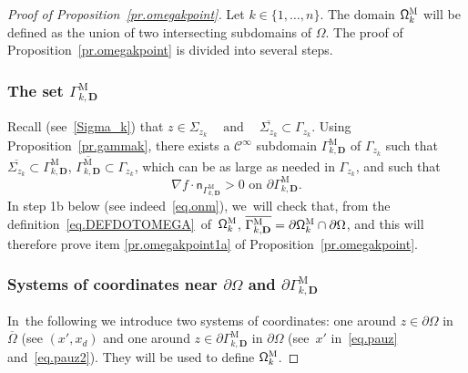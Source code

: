 \documentclass[10pt]{amsart}
\newcommand{\quand}{\quad\text{and}\quad}
\newcommand{\mbf}[1]{\mathbf{#1}}
\let\pa\partial
\theoremstyle{plain}
\theoremstyle{definition}
\begin{document}
\begin{proof}[Proof of Proposition~\ref{pr.omegakpoint}] Let $k\in \{1,\ldots,n\}$. The domain $\mathsf \Omega_k^{\textsc{M}}$ will be defined as the union of two intersecting subdomains of $\Omega$. The proof of Proposition~\ref{pr.omegakpoint} is divided into several steps.



\subsubsection*{The set $\Gamma_{k,\mbf D}^{\text{M}}$} Recall
(see~\eqref{Sigma_k}) that
$
z\in \Sigma_{z_k} \ \quand \ \overline{\Sigma_{z_k} }\subset \Gamma_{z_k}$.
Using Proposition~\ref{pr.gammak}, there exists a $\mathcal
C^\infty$ subdomain $\Gamma_{k,\mbf D}^{\text{M}}$ of $\Gamma_{z_k}$
such that $\overline{\Sigma_{z_k}}\subset \Gamma_{k,\mbf
D}^{\text{M}}$, $\overline{\Gamma_{k,\mbf D}^{\text{M}}}\subset
\Gamma_{z_k}$, which can be as large as needed in $\Gamma_{z_k}$, and
such that
\begin{equation}\label{eq.derivee_normale_positive}
\nabla f\cdot \mathsf n_{ \Gamma_{k,\mbf D}^{\text{M}} }>0 \text{ on } \pa \Gamma_{k,\mbf D}^{\text{M}}.
\end{equation}
In step 1b below (see indeed~\eqref{eq.onm}), we~will check that,
from the definition~\eqref{eq.DEFDOTOMEGA}~of~$\mathsf
\Omega_k^{\textsc{M}}$, $\overline{\Gamma_{k,\mbf D}^{\text{M}}}=
\pa \mathsf \Omega_k^{\textsc{M}}\cap \partial \Omega$, and this
will therefore prove item \eqref{pr.omegakpoint1a} of Proposition~\ref{pr.omegakpoint}.

\subsubsection*{Systems of coordinates near $\partial \Omega$ and $\pa \Gamma_{k,\mbf D}^{\text{M}}$}
In~the following we introduce two systems of coordinates: one around $z\in \partial \Omega$ in $\overline \Omega$ (see $(x',x_d)$ and one around $z\in \pa \Gamma_{k,\mbf D}^{\text{M}}$ in $\partial \Omega$ (see~$x'$ in~\eqref{eq.pauz} and~\eqref{eq.pauz2}). They will be used to define $\mathsf \Omega_k^{\textsc{M}}$.


\end{proof}
\end{document}
